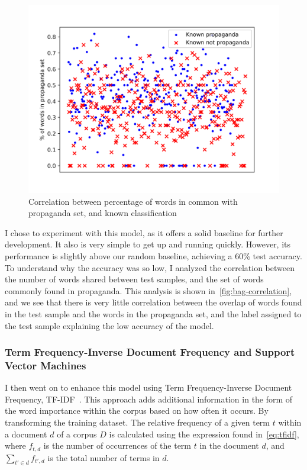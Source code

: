 \documentclass[twocolumn]{article}
\begin{document}
\begin{figure}[ht]
    \centering 
    \includegraphics[scale=0.5]{../assets/bag-of-words-correlation.png}
    \caption{Correlation between percentage of words in common with propaganda set, and known classification}
    \label{fig:bag-correlation}
\end{figure}

I chose to experiment with this model, as it offers a solid baseline for further development. It also is very simple to get up and running quickly. However, its performance is slightly above our random baseline, achieving a 60\% test accuracy. To understand why the accuracy was so low, I analyzed the correlation between the number of words shared between test samples, and the set of words commonly found in propaganda. This analysis is shown in~\autoref{fig:bag-correlation}, and we see that there is very little correlation between the overlap of words found in the test sample and the words in the propaganda set, and the label assigned to the test sample explaining the low accuracy of the model. 

\subsubsection{Term Frequency-Inverse Document Frequency and Support Vector Machines}

I then went on to enhance this model using Term Frequency-Inverse Document Frequency, TF-IDF~\cite{dadgar2016novel}. This approach adds additional information in the form of the word importance within the corpus based on how often it occurs. By transforming the training dataset. The relative frequency of a given term $t$ within a document $d$ of a corpus $D$ is calculated using the expression found in~\autoref{eq:tfidf}, where $f_{t, d}$ is the number of occurrences of the term $t$ in the document $d$, and $\sum_{t'\in d} f_{t', d}$ is the total number of terms in $d$.
\end{document}
